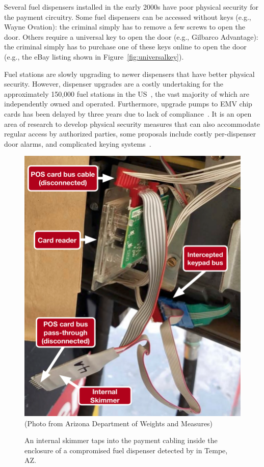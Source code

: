 Several fuel dispensers installed in the early 2000s have poor physical security
for the payment circuitry.
%
Some fuel dispensers can be accessed without keys (e.g., Wayne Ovation): the
criminal simply has to remove a few screws to open the door.
%
Others require a universal key to open the door (e.g., Gilbarco Advantage): the
criminal simply has to purchase one of these keys online to open the door (e.g.,
the eBay listing shown in Figure~\ref{fig:universalkey}).
  
Fuel stations are slowly upgrading to newer dispensers that have better
physical security.
%
However, dispenser upgrades are a costly undertaking for the approximately 150,000 fuel
stations in the US~\cite{npn-station-count}, the vast majority of which are
independently owned and operated.
%
Furthermore, upgrade pumps to EMV chip cards has been delayed by three
years due to lack of compliance~\cite{emv2020}. 
%
It is an open area of research to develop physical security measures that can
also accommodate regular access by authorized parties, some proposals include
costly per-dispenser door alarms, and complicated keying
systems~\cite{instakey}.

\begin{figure}
\centering
\includegraphics[width=0.8\linewidth]{fig/intskimmer-installation}\\
\small{(Photo from Arizona Department of Weights and Measures)}
\caption{
\label{fig:intskimmer-installation}
An internal skimmer taps into the payment cabling inside the enclosure of a
  compromised fuel dispenser detected by \bluetana in Tempe, AZ.
}
\end{figure}


